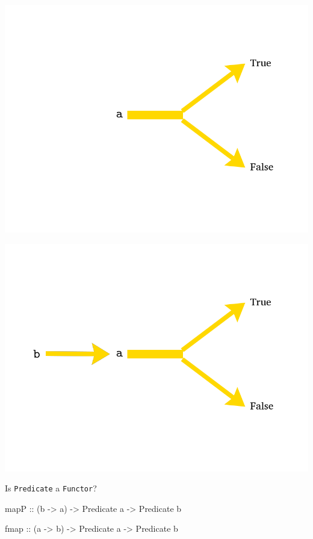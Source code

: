 \documentclass[UKenglish,usenames,dvipsnames,svgnames,table,aspectratio=169,mathserif]{beamer}
\newcommand{\nl}{\vspace{\baselineskip}}
\newcommand{\pnl}{\pause \nl}
\begin{document}
\begin{frame}
\includegraphics[width=150mm]{pred1.png}
\end{frame}


\begin{frame}
\includegraphics[width=150mm]{pred2.png}
\end{frame}


\begin{frame}[fragile]

Is {\tt Predicate} a {\tt Functor}?

\pnl

\begin{haskellcode}
mapP :: (b -> a) -> Predicate a -> Predicate b
\end{haskellcode}

\begin{haskellcode}
fmap :: (a -> b) -> Predicate a -> Predicate b
\end{haskellcode}

\end{frame}
\end{document}
